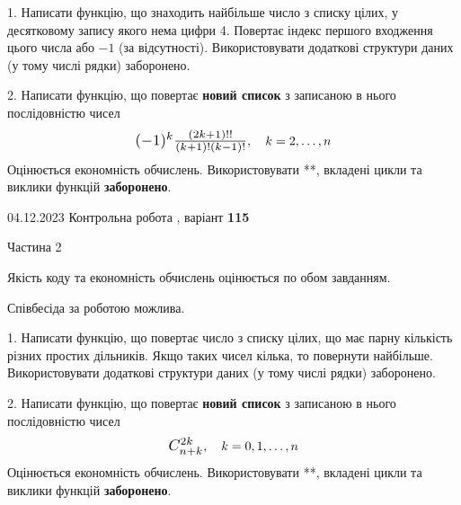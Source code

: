 \documentclass[12pt, ukrainian]{article}
\begin{document}
{{{{{{{{{{{{{{\begin {Large}
1. Написати функцію, що знаходить найбільше число з списку цілих, у десятковому запису якого нема цифри 4. Повертає індекс першого входження цього числа або $-1$ (за відсутності). Використовувати додаткові структури даних (у тому числі рядки) заборонено.

\vspace{10mm}



2. 
Написати функцію, що повертає \textbf{новий список} з записаною в нього послідовністю чисел
$$\scalebox{1.2}{$(-1)^{k}\frac{(2k+1)!!}{(k+1)!(k-1)!}$}, \quad k=2,\ldots,n$$
Оцінюється економність обчислень. Використовувати **, вкладені цикли та виклики функцій \textbf{заборонено}.

\end{Large}\newpage




\begin {Huge}
{{04.12.2023 Контрольна робота , варіант  \No \textbf { 115 }\par}}

\begin{center}Частина 2
\end{center}
\vspace{10mm}
\end {Huge}

{
\begin {Large}
Якість коду та економність обчислень оцінюється по обом завданням.

Співбесіда за роботою можлива.

\vspace{5mm}

1. Написати функцію, що повертає число з списку цілих, що має парну кількість різних простих дільників. Якщо таких чисел кілька, то повернути найбільше. Використовувати додаткові структури даних (у тому числі рядки) заборонено.

\vspace{10mm}



2. 
Написати функцію, що повертає \textbf{новий список} з записаною в нього послідовністю чисел
$$\scalebox{1.2}{$C_{n+k}^{2k}$}, \quad k=0,1,\ldots,n$$
Оцінюється економність обчислень. Використовувати **, вкладені цикли та виклики функцій \textbf{заборонено}.

\end{Large}\newpage

}}}}}}}}}}}}}}}
\end{document}
